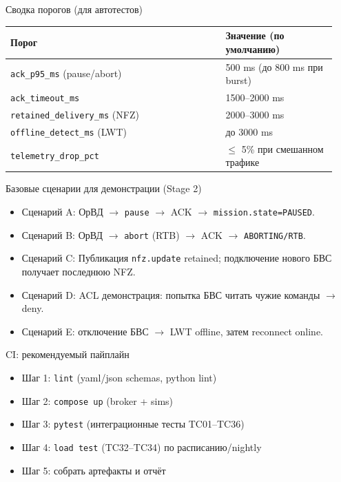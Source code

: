 \documentclass[aspectratio=169]{beamer}
\begin{document}
\begin{frame}{Сводка порогов (для автотестов)}
\small
\begin{tabular}{@{}p{0.62\linewidth}p{0.32\linewidth}@{}}
\toprule
Порог & Значение (по умолчанию) \\
\midrule
\texttt{ack\_p95\_ms} (pause/abort) & 500 ms (до 800 ms при burst) \\
\texttt{ack\_timeout\_ms} & 1500--2000 ms \\
\texttt{retained\_delivery\_ms} (NFZ) & 2000--3000 ms \\
\texttt{offline\_detect\_ms} (LWT) & до 3000 ms \\
\texttt{telemetry\_drop\_pct} & $\le$ 5\% при смешанном трафике \\
\bottomrule
\end{tabular}
\end{frame}

\begin{frame}{Базовые сценарии для демонстрации (Stage 2)}
\begin{itemize}
  \item Сценарий A: ОрВД $\rightarrow$ \texttt{pause} $\rightarrow$ ACK $\rightarrow$ \texttt{mission.state=PAUSED}.
  \item Сценарий B: ОрВД $\rightarrow$ \texttt{abort} (RTB) $\rightarrow$ ACK $\rightarrow$ \texttt{ABORTING/RTB}.
  \item Сценарий C: Публикация \texttt{nfz.update} retained; подключение нового БВС получает последнюю NFZ.
  \item Сценарий D: ACL демонстрация: попытка БВС читать чужие команды $\rightarrow$ deny.
  \item Сценарий E: отключение БВС $\rightarrow$ LWT offline, затем reconnect online.
\end{itemize}
\end{frame}

\begin{frame}{CI: рекомендуемый пайплайн}
\begin{itemize}
  \item Шаг 1: \texttt{lint} (yaml/json schemas, python lint)
  \item Шаг 2: \texttt{compose up} (broker + sims)
  \item Шаг 3: \texttt{pytest} (интеграционные тесты TC01--TC36)
  \item Шаг 4: \texttt{load test} (TC32--TC34) по расписанию/nightly
  \item Шаг 5: собрать артефакты и отчёт
\end{itemize}
\end{frame}
\end{document}
